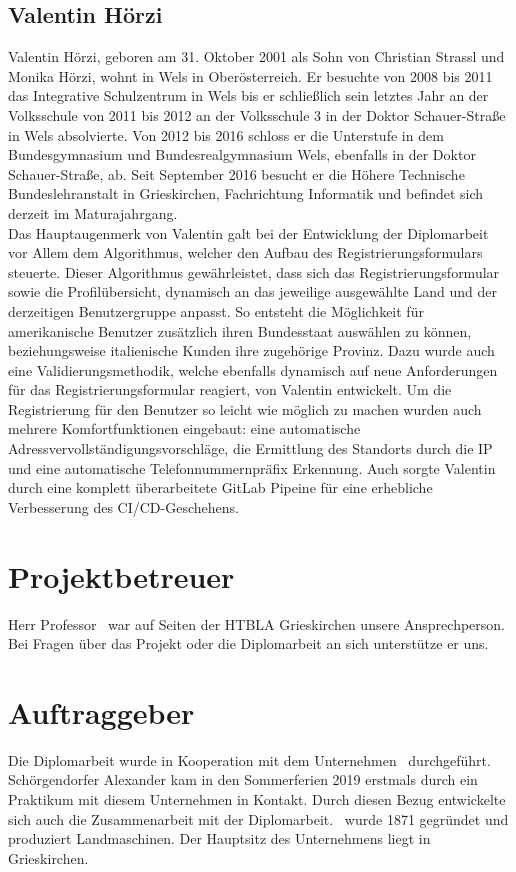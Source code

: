 \subsection{Valentin Hörzi}
Valentin Hörzi, geboren am 31. Oktober 2001 als Sohn von Christian Strassl und Monika Hörzi, wohnt in Wels in Oberösterreich. Er besuchte von 2008 bis 2011 das Integrative Schulzentrum in Wels bis er schließlich sein letztes Jahr an der Volksschule von 2011 bis 2012 an der Volksschule 3 in der Doktor Schauer-Straße in Wels absolvierte. Von 2012 bis 2016 schloss er die Unterstufe in dem Bundesgymnasium und Bundesrealgymnasium Wels, ebenfalls in der Doktor Schauer-Straße, ab. Seit September 2016 besucht er die Höhere Technische  Bundeslehranstalt in Grieskirchen, Fachrichtung Informatik und befindet sich derzeit im Maturajahrgang.\\
Das Hauptaugenmerk von Valentin galt bei der Entwicklung der Diplomarbeit vor Allem dem Algorithmus, welcher den Aufbau des Registrierungsformulars steuerte. Dieser Algorithmus gewährleistet, dass sich das Registrierungsformular sowie die Profilübersicht, dynamisch an das jeweilige ausgewählte Land und der derzeitigen Benutzergruppe anpasst. So entsteht die Möglichkeit für amerikanische Benutzer zusätzlich ihren Bundesstaat auswählen zu können, beziehungsweise italienische Kunden ihre zugehörige Provinz. Dazu wurde auch eine Validierungsmethodik, welche ebenfalls dynamisch auf neue Anforderungen für das Registrierungsformular reagiert, von Valentin entwickelt. Um die Registrierung für den Benutzer so leicht wie möglich zu machen wurden auch mehrere Komfortfunktionen eingebaut: eine automatische Adressvervollständigungsvorschläge, die Ermittlung des Standorts durch die IP und eine automatische Telefonnummernpräfix Erkennung. Auch sorgte Valentin durch eine komplett überarbeitete GitLab Pipeine für eine erhebliche Verbesserung des CI/CD-Geschehens.
\section{Projektbetreuer}
Herr Professor \ThSupervisorName \, war auf Seiten der HTBLA Grieskirchen unsere Ansprechperson. Bei Fragen über das Projekt oder die Diplomarbeit an sich unterstütze er uns.
\section{Auftraggeber}
Die Diplomarbeit wurde in Kooperation mit dem Unternehmen \ThPartnerName \, durchgeführt. Schörgendorfer Alexander kam in den Sommerferien 2019 erstmals durch ein Praktikum mit diesem Unternehmen in Kontakt. Durch diesen Bezug entwickelte sich auch die Zusammenarbeit mit der Diplomarbeit. \ThPartnerName \, wurde 1871 gegründet und produziert Landmaschinen. Der Hauptsitz des Unternehmens liegt in Grieskirchen.
